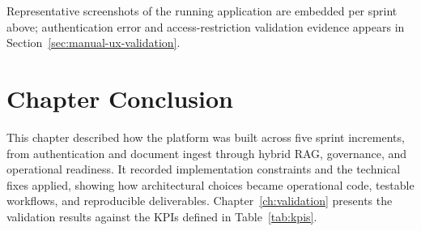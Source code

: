Representative screenshots of the running application are embedded per sprint
above; authentication error and access-restriction validation evidence appears in
Section~\ref{sec:manual-ux-validation}.

\section{Chapter Conclusion}

This chapter described how the platform was built across five sprint increments,
from authentication and document ingest through hybrid RAG, governance, and
operational readiness. It recorded implementation constraints and the technical
fixes applied, showing how architectural choices became operational code, testable
workflows, and reproducible deliverables. Chapter~\ref{ch:validation} presents
the validation results against the KPIs defined in Table~\ref{tab:kpis}.
